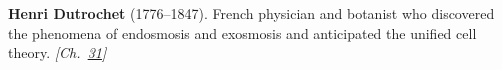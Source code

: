 \textbf{Henri Dutrochet} (1776–1847). French physician and botanist who discovered the phenomena of endosmosis and exosmosis and anticipated the unified cell theory. \emph{[Ch.~\hyperref[ch:osmosisdebye]{31}]}

